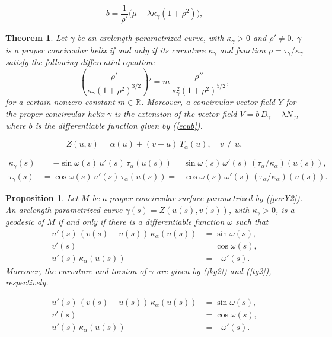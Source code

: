 \documentclass[10pt,a4paper]{amsart}
\newtheorem{theorem}{Theorem}
\newtheorem{proposition}{Proposition}
\def\R#1{\ensuremath{\mathbb{R}^{#1}}}
\def\Y{Z}
\begin{document}
\begin{equation}\label{ecub}
b=\frac{1}{\rho'}\big(\mu+\lambda\kappa_\gamma(1+\rho^2)\big),
\end{equation}

\begin{theorem}\label{teoconc1}
Let $\gamma$ be an arclength parametrized curve, with $\kappa_\gamma>0$ and $\rho'\neq0$. $\gamma$ is a proper concircular helix if and only if its curvature $\kappa_\gamma$ and function $\rho=\tau_\gamma/\kappa_\gamma$ satisfy the following differential equation:
\[
\left(\frac{\rho'}{\kappa_\gamma(1+\rho^2)^{3/2}}\right)'= m\,\frac{\rho''}{\kappa_\gamma^2(1+\rho^2)^{5/2}},
\]
for a certain nonzero constant $m\in\R{}$. Moreover, a concircular vector field $Y$ for the proper concircular helix $\gamma$ is the extension of the vector field  $V=b\,D_\gamma+ \lambda N_\gamma$, where $b$ is the differentiable function given by (\ref{ecub}).
\end{theorem}

\begin{equation}\label{parY2}
\Y(u,v)=\alpha(u)+(v-u)\,T_\alpha(u),\quad v\neq u,
\end{equation}

\begin{align}
\kappa_\gamma(s) &= -\sin\omega(s)\,u'(s)\,\tau_\alpha(u(s))= \sin\omega(s)\,\omega'(s)\,(\tau_\alpha/\kappa_\alpha)(u(s)),\label{kg2}\\
\tau_\gamma(s) &= \cos\omega(s)\,u'(s)\,\tau_\alpha(u(s))= -\cos\omega(s)\,\omega'(s)\,(\tau_\alpha/\kappa_\alpha)(u(s)).\label{tg2}
\end{align}

\begin{proposition}\label{p3}
Let $M$ be a proper concircular surface parametrized by (\ref{parY2}). An arclength parametrized curve $\gamma(s)=\Y(u(s),v(s))$, with $\kappa_\gamma>0$, is a geodesic of $M$ if and only if there is a differentiable function $\omega$ such that
\begin{align}
u'(s)\,(v(s)-u(s))\,\kappa_\alpha(u(s)) &= \sin\omega(s),\label{p2.1}\\
v'(s) &= \cos\omega(s),\label{p2.2}\\
u'(s)\,\kappa_\alpha(u(s)) &= -\omega'(s).\label{p2.3}
\end{align}
Moreover, the curvature and torsion of $\gamma$ are given by (\ref{kg2}) and (\ref{tg2}), respectively.
\end{proposition}

\begin{align}
u'(s)\,(v(s)-u(s))\,\kappa_\alpha(u(s)) &= \sin\omega(s),\\
v'(s) &= \cos\omega(s),\\
u'(s)\,\kappa_\alpha(u(s)) &= -\omega'(s).
\end{align}
\end{document}
